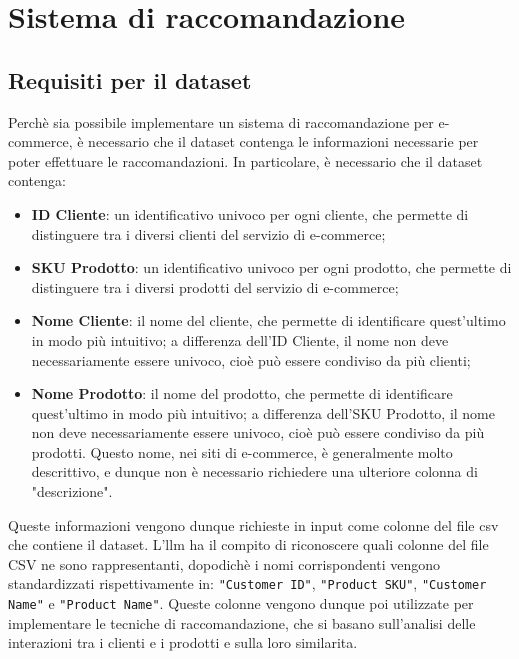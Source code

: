 \chapter{Sistema di raccomandazione}
\label{cap:sistema-raccomandazione}


\section{Requisiti per il dataset}

Perchè sia possibile implementare un sistema di raccomandazione per e-commerce, è necessario che il dataset contenga le informazioni necessarie per poter effettuare le raccomandazioni. In particolare, è necessario che il dataset contenga:
\begin{itemize}
    \item \textbf{ID Cliente}: un identificativo univoco per ogni cliente, che permette di distinguere tra i diversi clienti del servizio di e-commerce;
    \item \textbf{SKU Prodotto}: un identificativo univoco per ogni prodotto, che permette di distinguere tra i diversi prodotti del servizio di e-commerce;
    \item \textbf{Nome Cliente}: il nome del cliente, che permette di identificare quest'ultimo in modo più intuitivo; a differenza dell'ID Cliente, il nome non deve necessariamente essere univoco, cioè può essere condiviso da più clienti;
    \item \textbf{Nome Prodotto}: il nome del prodotto, che permette di identificare quest'ultimo in modo più intuitivo; a differenza dell'SKU Prodotto, il nome non deve necessariamente essere univoco, cioè può essere condiviso da più prodotti. Questo nome, nei siti di e-commerce, è generalmente molto descrittivo, e dunque non è necessario richiedere una ulteriore colonna di "descrizione".
\end{itemize}

Queste informazioni vengono dunque richieste in input come colonne del file \gls{csv} che contiene il dataset. L'\gls{llm} ha il compito di riconoscere quali colonne del file CSV ne sono rappresentanti, dopodichè i nomi corrispondenti vengono standardizzati rispettivamente in: \texttt{"Customer ID"}, \texttt{"Product SKU"}, \texttt{"Customer Name"} e \texttt{"Product Name"}. Queste colonne vengono dunque poi utilizzate per implementare le tecniche di raccomandazione, che si basano sull'analisi delle interazioni tra i clienti e i prodotti e sulla loro \gls{similarita}.

